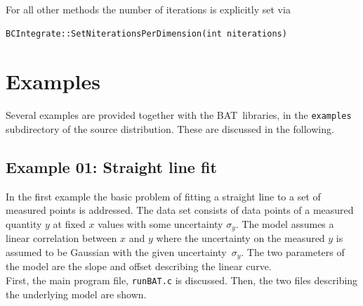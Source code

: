\documentclass[11pt, a4paper]{article}
\newcommand{\BAT}{{\sc BAT}}
\begin{document}
\noindent 
For all other methods the number of iterations is explicitly set via 
%
\begin{verbatim}
BCIntegrate::SetNiterationsPerDimension(int niterations) 
\end{verbatim} 


\section{Examples}
\label{section:examples} 

Several examples are provided together with the \BAT\ libraries,
in the \verb|examples| subdirectory of the source distribution. 
These 
are discussed in the following. 


\subsection{Example 01: Straight line fit} 

In the first example the basic problem of fitting a straight line to a
set of measured points is addressed. The data set consists of data
points of a measured quantity $y$ at fixed $x$ values with some
uncertainty $\sigma_{y}$. The model assumes a linear correlation
between $x$ and $y$ where the uncertainty on the measured $y$ is
assumed to be Gaussian with the given uncertainty~$\sigma_{y}$. The
two parameters of the model are the slope and offset describing the
linear curve. \\

\noindent 
First, the main program file, \verb|runBAT.c| is discussed. Then, the
two files describing the underlying model are shown. \\ 

\pagebreak 
\end{document}
